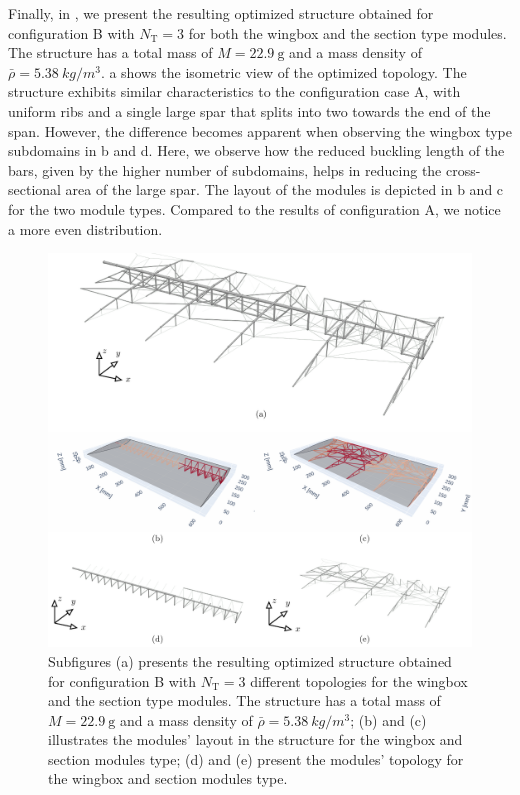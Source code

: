 Finally, in , we present the resulting optimized structure obtained for configuration B with $N_\text{T}=3$ for both the wingbox and the section type modules. The structure has a total mass of $M=\qty{22.9}{\gram}$ and a mass density of $\bar{\rho}=\qty{5.38}{kg/m^3}$. a shows the isometric view of the optimized topology. The structure exhibits similar characteristics to the configuration case A, with uniform ribs and a single large spar that splits into two towards the end of the span. However, the difference becomes apparent when observing the wingbox type subdomains in b and d. Here, we observe how the reduced buckling length of the bars, given by the higher number of subdomains, helps in reducing the cross-sectional area of the large spar. The layout of the modules is depicted in b and c for the two module types. Compared to the results of configuration A, we notice a more even distribution.

\begin{figure}
    \centering
    \includegraphics[width=\linewidth]{figures/07_aeronautic/00_NACA_b_sol_3/gs_a.pdf}
        \caption{Subfigures (a) presents the resulting optimized structure obtained for configuration B with $N_\text{T}=3$ different topologies for the wingbox and the section type modules. The structure has a total mass of $M=\qty{22.9}{\gram}$ and a mass density of $\bar{\rho}=\qty{5.38}{kg/m^3}$; (b) and (c) illustrates the modules' layout in the structure for the wingbox and section modules type; (d) and (e) present the modules' topology for the wingbox and section modules type.}
    \label{fig:07_topology_naca_b}
\end{figure}

